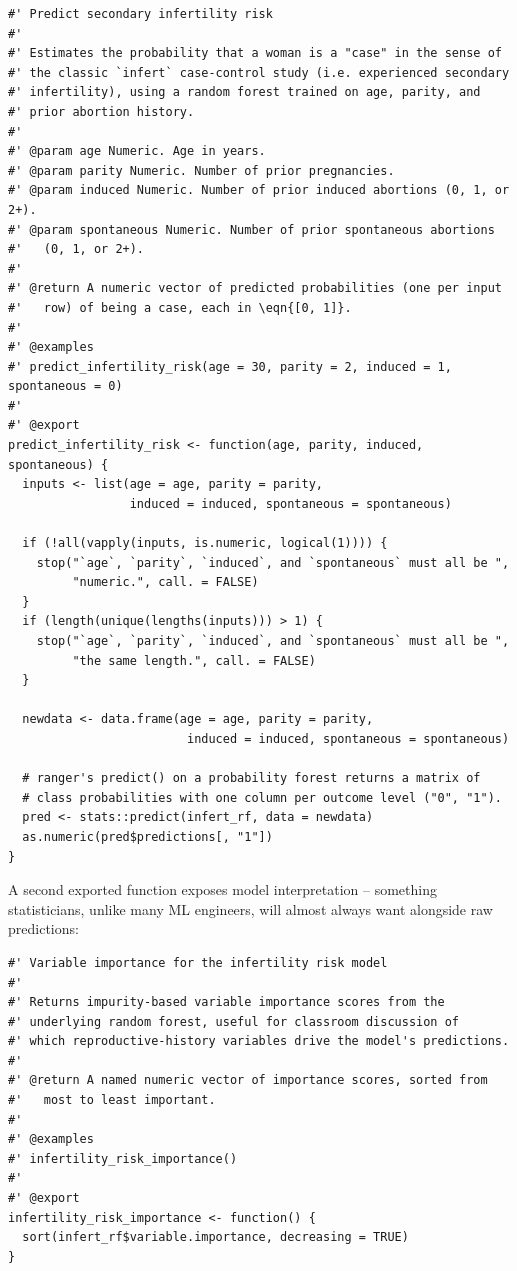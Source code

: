 \documentclass[11pt]{article}
\begin{document}
\begin{lstlisting}
#' Predict secondary infertility risk
#'
#' Estimates the probability that a woman is a "case" in the sense of
#' the classic `infert` case-control study (i.e. experienced secondary
#' infertility), using a random forest trained on age, parity, and
#' prior abortion history.
#'
#' @param age Numeric. Age in years.
#' @param parity Numeric. Number of prior pregnancies.
#' @param induced Numeric. Number of prior induced abortions (0, 1, or 2+).
#' @param spontaneous Numeric. Number of prior spontaneous abortions
#'   (0, 1, or 2+).
#'
#' @return A numeric vector of predicted probabilities (one per input
#'   row) of being a case, each in \eqn{[0, 1]}.
#'
#' @examples
#' predict_infertility_risk(age = 30, parity = 2, induced = 1, spontaneous = 0)
#'
#' @export
predict_infertility_risk <- function(age, parity, induced, spontaneous) {
  inputs <- list(age = age, parity = parity,
                 induced = induced, spontaneous = spontaneous)

  if (!all(vapply(inputs, is.numeric, logical(1)))) {
    stop("`age`, `parity`, `induced`, and `spontaneous` must all be ",
         "numeric.", call. = FALSE)
  }
  if (length(unique(lengths(inputs))) > 1) {
    stop("`age`, `parity`, `induced`, and `spontaneous` must all be ",
         "the same length.", call. = FALSE)
  }

  newdata <- data.frame(age = age, parity = parity,
                         induced = induced, spontaneous = spontaneous)

  # ranger's predict() on a probability forest returns a matrix of
  # class probabilities with one column per outcome level ("0", "1").
  pred <- stats::predict(infert_rf, data = newdata)
  as.numeric(pred$predictions[, "1"])
}
\end{lstlisting}

A second exported function exposes model interpretation -- something statisticians, unlike many ML engineers, will almost always want alongside raw predictions:

\begin{lstlisting}
#' Variable importance for the infertility risk model
#'
#' Returns impurity-based variable importance scores from the
#' underlying random forest, useful for classroom discussion of
#' which reproductive-history variables drive the model's predictions.
#'
#' @return A named numeric vector of importance scores, sorted from
#'   most to least important.
#'
#' @examples
#' infertility_risk_importance()
#'
#' @export
infertility_risk_importance <- function() {
  sort(infert_rf$variable.importance, decreasing = TRUE)
}
\end{lstlisting}
\end{document}
